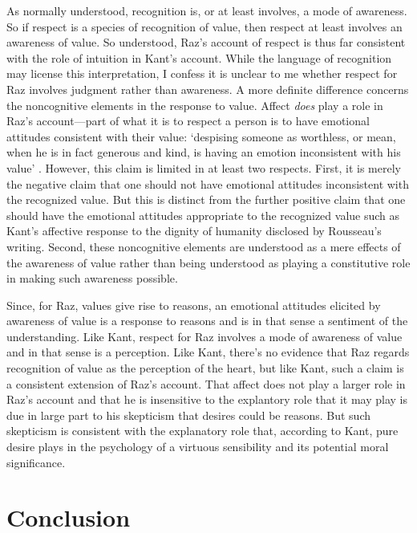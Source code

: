 \documentclass[12pt]{article}
\begin{document}
As normally understood, recognition is, or at least involves, a mode of awareness. So if respect is a species of recognition of value, then respect at least involves an awareness of value. So understood, Raz's account of respect is thus far consistent with the role of intuition in Kant's account. While the language of recognition may license this interpretation, I confess it is unclear to me whether respect for Raz involves judgment rather than awareness. A more definite difference concerns the noncognitive elements in the response to value. Affect \emph{does} play a role in Raz's account---part of what it is to respect a person is to have emotional attitudes consistent with their value: `despising someone as worthless, or mean, when he is in fact generous and kind, is having an emotion inconsistent with his value' \citep[161]{Raz:2001ps}. However, this claim is limited in at least two respects. First, it is merely the negative claim that one should not have emotional attitudes inconsistent with the recognized value. But this is distinct from the further positive claim that one should have the emotional attitudes appropriate to the recognized value such as Kant's affective response to the dignity of humanity disclosed by Rousseau's writing. Second, these noncognitive elements are understood as a mere effects of the awareness of value rather than being understood as playing a constitutive role in making such awareness possible. 

Since, for Raz, values give rise to reasons, an emotional attitudes elicited by awareness of value is a response to reasons and is in that sense a sentiment of the understanding. Like Kant, respect for Raz involves a mode of awareness of value and in that sense is a perception. Like Kant, there's no evidence that Raz regards recognition of value as the perception of the heart, but like Kant, such a claim is a consistent extension of Raz's account. That affect does not play a larger role in Raz's account and that he is insensitive to the explantory role that it may play is due in large part to his skepticism that desires could be reasons. But such skepticism is consistent with the explanatory role that, according to Kant, pure desire plays in the psychology of a virtuous sensibility and its potential moral significance. 




\section{Conclusion} \label{sec:conclusion} %
\end{document}
